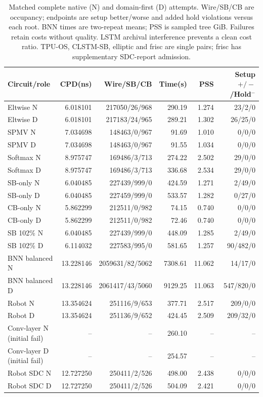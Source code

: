 \documentclass[conference,10pt]{IEEEtran}
\begin{document}
\begin{table}[t]
\centering\footnotesize\setlength{\tabcolsep}{3pt}
\caption{Matched complete native (N) and domain-first (D) attempts. Wire/SB/CB are occupancy; endpoints are setup better/worse and added hold violations versus each root. BNN times are two-repeat means; PSS is sampled tree GiB. Failures retain costs without quality. LSTM archival interference prevents a clean cost ratio. TPU-OS, CLSTM-SB, elliptic and frisc are single pairs; frisc has supplementary SDC-report admission.}
\label{tab:completecost}
\begin{tabular}{lrrrrr}\hline
Circuit/role & CPD(ns) & Wire/SB/CB & Time(s) & PSS & Setup $+/-$/Hold$^-$\\\hline
Eltwise N&6.018101&217050/26/968&290.19&1.274&23/2/0\\
Eltwise D&6.018101&217183/24/965&289.21&1.302&26/25/0\\
SPMV N&7.034698&148463/0/967&91.69&1.010&0/0/0\\
SPMV D&7.034698&148463/0/967&91.55&1.034&0/0/0\\
Softmax N&8.975747&169486/3/713&274.22&2.502&29/0/0\\
Softmax D&8.975747&169486/3/713&336.68&2.534&29/0/0\\
SB-only N&6.040485&227439/999/0&424.59&1.271&2/49/0\\
SB-only D&6.040485&227459/999/0&533.57&1.282&0/27/0\\
CB-only N&5.862299&212511/0/982&74.15&0.740&0/0/0\\
CB-only D&5.862299&212511/0/982&72.46&0.740&0/0/0\\
SB 102\% N&6.040485&227439/999/0&448.09&1.285&2/49/0\\
SB 102\% D&6.114032&227583/995/0&581.65&1.257&90/482/0\\
BNN balanced N&13.228146&2059631/82/5062&7308.61&11.062&14/17/0\\
BNN balanced D&13.228146&2061417/43/5060&9129.25&11.063&547/820/0\\
Robot N&13.354624&251116/9/653&377.71&2.517&209/0/0\\
Robot D&13.354624&251136/9/652&424.45&2.509&209/32/0\\
Conv-layer N (initial fail)&--&--&260.10&--&--\\
Conv-layer D (initial fail)&--&--&254.57&--&--\\
Robot SDC N&12.727250&250411/2/526&498.00&2.438&0/0/0\\
Robot SDC D&12.727250&250411/2/526&504.09&2.421&0/0/0\\

\end{tabular}
\end{table}
\end{document}
